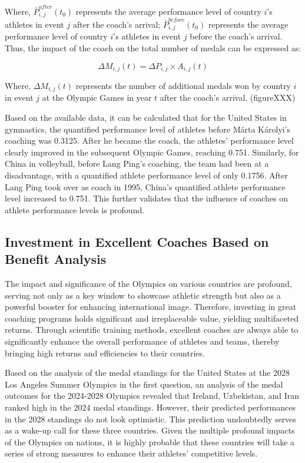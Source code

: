 \documentclass{mcmthesis}
\begin{document}
Where, $\bar{P}_{i, j}^{after}(t_{0})$ represents the average performance level of country $i$'s athletes in event $j$ after the coach's arrival; $\bar{P}_{i, j}^{before}(t_{0})$ represents the average performance level of country $i$'s athletes in event $j$ before the coach's arrival. Thus, the impact of the coach on the total number of medals can be expressed as:

\begin{equation}
\Delta M_{i, j}(t) = \Delta P_{i, j} \times A_{i, j}(t)
\end{equation}

Where, $\Delta M_{i, j}(t)$ represents the number of additional medals won by country $i$ in event $j$ at the Olympic Games in year $t$ after the coach's arrival.
(figureXXX)

Based on the available data, it can be calculated that for the United States in gymnastics, the quantified performance level of athletes before Márta Károlyi's coaching was 0.3125. After he became the coach, the athletes' performance level clearly improved in the subsequent Olympic Games, reaching 0.751. Similarly, for China in volleyball, before Lang Ping's coaching, the team had been at a disadvantage, with a quantified athlete performance level of only 0.1756. After Lang Ping took over as coach in 1995, China's quantified athlete performance level increased to 0.751. This further validates that the influence of coaches on athlete performance levels is profound.

\subsection{Investment in Excellent Coaches Based on Benefit Analysis}
The impact and significance of the Olympics on various countries are profound, serving not only as a key window to showcase athletic strength but also as a powerful booster for enhancing international image. Therefore, investing in great coaching programs holds significant and irreplaceable value, yielding multifaceted returns. Through scientific training methods, excellent coaches are always able to significantly enhance the overall performance of athletes and teams, thereby bringing high returns and efficiencies to their countries.

Based on the analysis of the medal standings for the United States at the 2028 Los Angeles Summer Olympics in the first question, an analysis of the medal outcomes for the 2024-2028 Olympics revealed that Ireland, Uzbekistan, and Iran ranked high in the 2024 medal standings. However, their predicted performances in the 2028 standings do not look optimistic. This prediction undoubtedly serves as a wake-up call for these three countries. Given the multiple profound impacts of the Olympics on nations, it is highly probable that these countries will take a series of strong measures to enhance their athletes' competitive levels.
\end{document}
